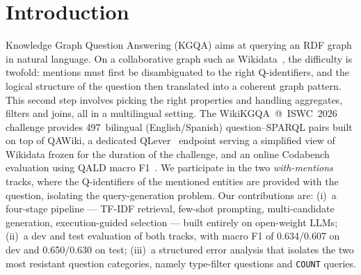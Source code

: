 \documentclass[]{ceurart}
\begin{document}
\maketitle

\section{Introduction}
\label{sec:intro}
Knowledge Graph Question Answering (KGQA) aims at querying an RDF graph in natural language. On a collaborative graph such as Wikidata~\cite{vrandecic2014wikidata}, the difficulty is twofold: mentions must first be disambiguated to the right Q-identifiers, and the logical structure of the question then translated into a coherent graph pattern. This second step involves picking the right properties and handling aggregates, filters and joins, all in a multilingual setting. The WikiKGQA~@~ISWC~2026 challenge provides \num{497}~bilingual (English/Spanish) question–SPARQL pairs built on top of QAWiki, a dedicated QLever~\cite{bast2017qlever} endpoint serving a simplified view of Wikidata frozen for the duration of the challenge, and an online Codabench evaluation using QALD macro F1~\cite{perevalov2022qald10}. We participate in the two \emph{with-mentions} tracks, where the Q-identifiers of the mentioned entities are provided with the question, isolating the query-generation problem. Our contributions are: (i)~a four-stage pipeline — TF-IDF retrieval, few-shot prompting, multi-candidate generation, execution-guided selection — built entirely on open-weight LLMs; (ii)~a dev and test evaluation of both tracks, with macro F1 of 0.634/0.607 on dev and 0.650/0.630 on test; (iii)~a structured error analysis that isolates the two most resistant question categories, namely type-filter questions and \texttt{COUNT} queries.

\end{document}
